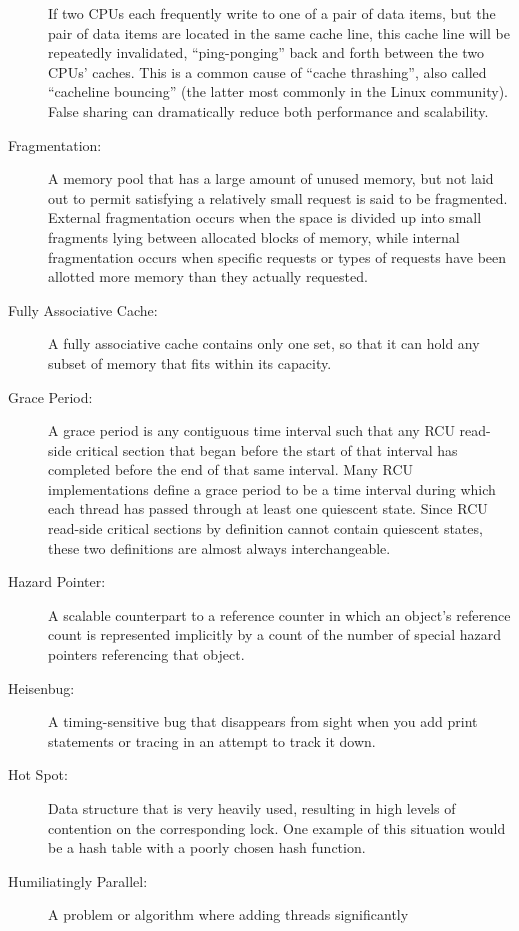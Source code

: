 \begin{description}
	If two CPUs each frequently write to one of a pair of data items,
	but the pair of data items are located in the same cache line,
	this cache line will be repeatedly invalidated, ``ping-ponging''
	back and forth between the two CPUs' caches.
	This is a common cause of ``cache thrashing'', also called
	``cacheline bouncing'' (the latter most commonly in the Linux
	community).
	False sharing can dramatically reduce both performance and
	scalability.
\item[Fragmentation:]
	A memory pool that has a large amount of unused memory, but
	not laid out to permit satisfying a relatively small request
	is said to be fragmented.
	External fragmentation occurs when the space is divided up
	into small fragments lying between allocated blocks of memory,
	while internal fragmentation occurs when specific requests or
	types of requests have been allotted more memory than they
	actually requested.
\item[Fully Associative Cache:]
	A fully associative cache contains only
	one set, so that it can hold any subset of
	memory that fits within its capacity.
\item[Grace Period:]
	A grace period is any contiguous time interval such that
	any RCU read-side critical section that began before the
	start of that interval has
	completed before the end of that same interval.
	Many RCU implementations define a grace period to be a
	time interval during which each thread has passed through at
	least one quiescent state.
	Since RCU read-side critical sections by definition cannot
	contain quiescent states, these two definitions are almost
	always interchangeable.
\item[Hazard Pointer:]
	A scalable counterpart to a reference counter in which an
	object's reference count is represented implicitly by a count
	of the number of special hazard pointers referencing that object.
\item[Heisenbug:]
	A timing-sensitive bug that disappears from sight when you
	add print statements or tracing in an attempt to track it
	down.
\item[Hot Spot:]
	Data structure that is very heavily used, resulting in high
	levels of contention on the corresponding lock.
	One example of this situation would be a hash table with
	a poorly chosen hash function.
\item[Humiliatingly Parallel:]
	A problem or algorithm where adding threads significantly

\end{description}
